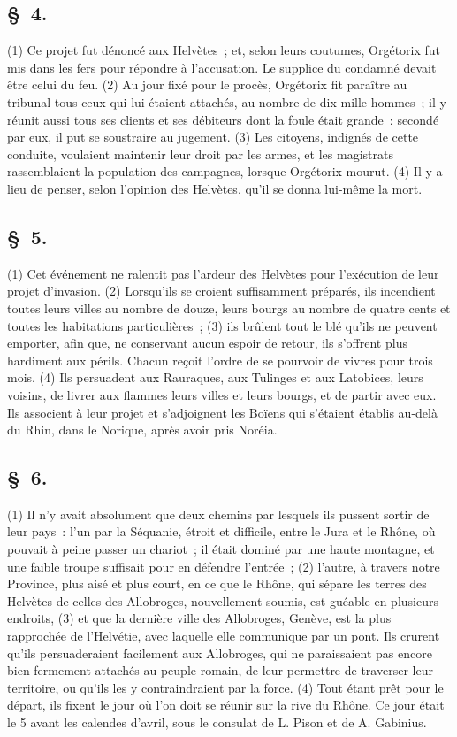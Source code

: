 \documentclass[french,twoside]{book} %
\begin{document}
\subsection[{§ 4.}]{ \textsc{§ 4.} }
\noindent (1) Ce projet fut dénoncé aux Helvètes ; et, selon leurs coutumes, Orgétorix fut mis dans les fers pour répondre à l’accusation. Le supplice du condamné devait être celui du feu. (2) Au jour fixé pour le procès, Orgétorix fit paraître au tribunal tous ceux qui lui étaient attachés, au nombre de dix mille hommes ; il y réunit aussi tous ses clients et ses débiteurs dont la foule était grande : secondé par eux, il put se soustraire au jugement. (3) Les citoyens, indignés de cette conduite, voulaient maintenir leur droit par les armes, et les magistrats rassemblaient la population des campagnes, lorsque Orgétorix mourut. (4) Il y a lieu de penser, selon l’opinion des Helvètes, qu’il se donna lui-même la mort.
\subsection[{§ 5.}]{ \textsc{§ 5.} }
\noindent (1) Cet événement ne ralentit pas l’ardeur des Helvètes pour l’exécution de leur projet d’invasion. (2) Lorsqu’ils se croient suffisamment préparés, ils incendient toutes leurs villes au nombre de douze, leurs bourgs au nombre de quatre cents et toutes les habitations particulières ; (3) ils brûlent tout le blé qu’ils ne peuvent emporter, afin que, ne conservant aucun espoir de retour, ils s’offrent plus hardiment aux périls. Chacun reçoit l’ordre de se pourvoir de vivres pour trois mois. (4) Ils persuadent aux Rauraques, aux Tulinges et aux Latobices, leurs voisins, de livrer aux flammes leurs villes et leurs bourgs, et de partir avec eux. Ils associent à leur projet et s’adjoignent les Boïens qui s’étaient établis au-delà du Rhin, dans le Norique, après avoir pris Noréia.
\subsection[{§ 6.}]{ \textsc{§ 6.} }
\noindent (1) Il n’y avait absolument que deux chemins par lesquels ils pussent sortir de leur pays : l’un par la Séquanie, étroit et difficile, entre le Jura et le Rhône, où pouvait à peine passer un chariot ; il était dominé par une haute montagne, et une faible troupe suffisait pour en défendre l’entrée ; (2) l’autre, à travers notre Province, plus aisé et plus court, en ce que le Rhône, qui sépare les terres des Helvètes de celles des Allobroges, nouvellement soumis, est guéable en plusieurs endroits, (3) et que la dernière ville des Allobroges, Genève, est la plus rapprochée de l’Helvétie, avec laquelle elle communique par un pont. Ils crurent qu’ils persuaderaient facilement aux Allobroges, qui ne paraissaient pas encore bien fermement attachés au peuple romain, de leur permettre de traverser leur territoire, ou qu’ils les y contraindraient par la force. (4) Tout étant prêt pour le départ, ils fixent le jour où l’on doit se réunir sur la rive du Rhône. Ce jour était le 5 avant les calendes d’avril, sous le consulat de L. Pison et de A. Gabinius.
\end{document}
